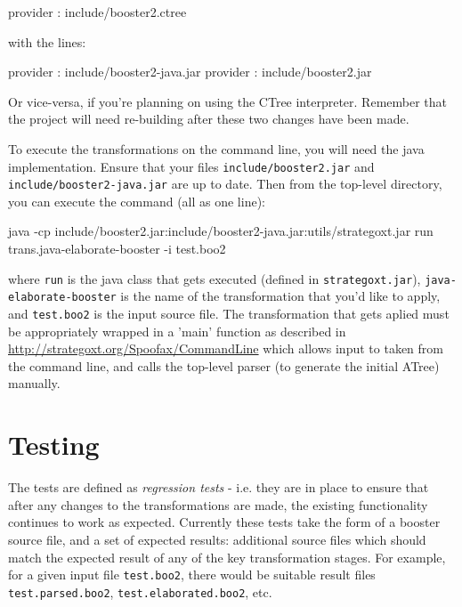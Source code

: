 \begin{code}
provider : include/booster2.ctree  
\end{code}

with the lines:

\begin{code}
provider : include/booster2-java.jar                                                                                      
provider : include/booster2.jar  
\end{code}

Or vice-versa, if you're planning on using the CTree interpreter.
Remember that the project will need re-building after these two
changes have been made.

To execute the transformations on the command line, you will need the
java implementation.  Ensure that your files
\verb|include/booster2.jar| and \verb|include/booster2-java.jar| are
up to date.  Then from the top-level directory, you can execute the
command (all as one line):

\begin{code}
java -cp 
include/booster2.jar:include/booster2-java.jar:utils/strategoxt.jar
run trans.java-elaborate-booster -i test.boo2
\end{code}

where \verb|run| is the java class that gets executed (defined in
\verb|strategoxt.jar|), \verb|java-elaborate-booster| is the name of
the transformation that you'd like to apply, and \verb|test.boo2| is
the input source file.  The transformation that gets aplied must be
appropriately wrapped in a 'main' function as described in
\url{http://strategoxt.org/Spoofax/CommandLine} which allows input to
taken from the command line, and calls the top-level parser (to
generate the initial ATree) manually. 

\section{Testing}

The tests are defined as \emph{regression tests} - i.e. they are in
place to ensure that after any changes to the transformations are
made, the existing functionality continues to work as expected.
Currently these tests take the form of a booster source file, and a
set of expected results: additional source files which should match
the expected result of any of the key transformation stages.  For
example, for a given input file \verb|test.boo2|, there would be
suitable result files \verb|test.parsed.boo2|,
\verb|test.elaborated.boo2|, etc.

